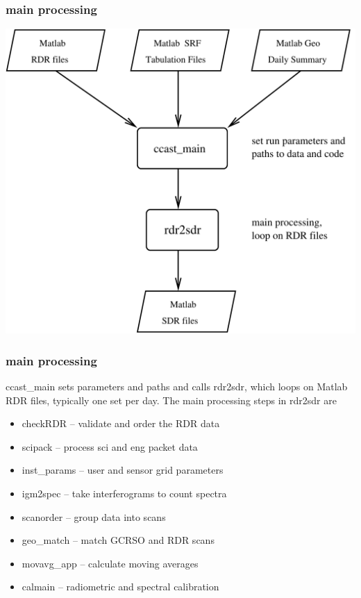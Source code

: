 \documentclass[11pt]{beamer}
\begin{document}
\begin{frame}
\frametitle{main processing}

\begin{center}
  \includegraphics[scale=0.4]{figures/mainpro.pdf}
\end{center}

\end{frame}
\begin{frame}
\frametitle{main processing}

ccast\_main sets parameters and paths and calls rdr2sdr, which loops
on Matlab RDR files, typically one set per day.  The main processing
steps in rdr2sdr are

\begin{itemize}
  \item checkRDR -- validate and order the RDR data
  \item scipack  -- process sci and eng packet data
  \item inst\_params -- user and sensor grid parameters
  \item igm2spec -- take interferograms to count spectra
  \item scanorder -- group data into scans
  \item geo\_match  -- match GCRSO and RDR scans
  \item movavg\_app -- calculate moving averages
  \item calmain  -- radiometric and spectral calibration
\end{itemize}

\end{frame}
\end{document}
